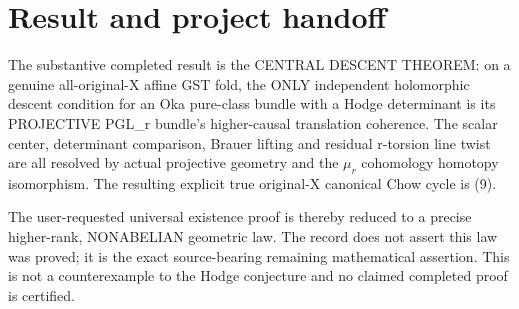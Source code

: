 \documentclass[11pt]{article}
\begin{document}
\section{Result and project handoff}
The substantive completed result
is the CENTRAL DESCENT THEOREM:
on a genuine all-original-X
affine GST fold, the ONLY
independent holomorphic descent
condition for an Oka pure-class
bundle with a Hodge determinant
is its PROJECTIVE PGL_r
bundle's higher-causal
translation coherence. The
scalar center, determinant
comparison, Brauer lifting
and residual r-torsion
line twist are all resolved
by actual projective geometry
and the $\mu_r$ cohomology
homotopy isomorphism.
The resulting explicit true
original-X canonical Chow cycle
is (9).

The user-requested universal
existence proof is thereby
reduced to a precise higher-rank,
NONABELIAN geometric law.
The record does not assert
this law was proved; it is
the exact source-bearing
remaining mathematical
assertion. This is not a
counterexample to the Hodge
conjecture and no claimed
completed proof is certified.
\end{document}
